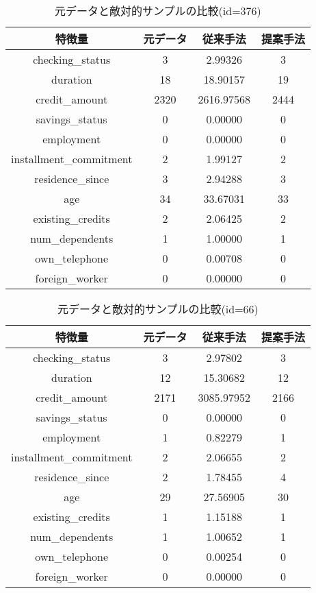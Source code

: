 \begin{table}[H]
    \centering
    \caption{元データと敵対的サンプルの比較(id=376)}
    \begin{tabular}{|c|c|c|c|} \hline
        特徴量 & 元データ & 従来手法 & 提案手法 \\ \hline
        checking\_status & 3 & 2.99326 & 3 \\ \hline
        duration & 18 & 18.90157 & 19 \\ \hline
        credit\_amount & 2320 & 2616.97568 & 2444 \\ \hline
        savings\_status & 0 & 0.00000 & 0 \\ \hline
        employment & 0 & 0.00000 & 0 \\ \hline
        installment\_commitment & 2 & 1.99127 & 2 \\ \hline
        residence\_since & 3 & 2.94288 & 3 \\ \hline
        age & 34 & 33.67031 & 33 \\ \hline
        existing\_credits & 2 & 2.06425 & 2 \\ \hline
        num\_dependents & 1 & 1.00000 & 1 \\ \hline
        own\_telephone & 0 & 0.00708 & 0 \\ \hline
        foreign\_worker & 0 & 0.00000 & 0 \\ \hline
    \end{tabular}
\end{table}

\begin{table}[H]
    \centering
    \caption{元データと敵対的サンプルの比較(id=66)}
    \begin{tabular}{|c|c|c|c|} \hline
        特徴量 & 元データ & 従来手法 & 提案手法 \\ \hline
        checking\_status & 3 & 2.97802 & 3 \\ \hline
        duration & 12 & 15.30682 & 12 \\ \hline
        credit\_amount & 2171 & 3085.97952 & 2166 \\ \hline
        savings\_status & 0 & 0.00000 & 0 \\ \hline
        employment & 1 & 0.82279 & 1 \\ \hline
        installment\_commitment & 2 & 2.06655 & 2 \\ \hline
        residence\_since & 2 & 1.78455 & 4 \\ \hline
        age & 29 & 27.56905 & 30 \\ \hline
        existing\_credits & 1 & 1.15188 & 1 \\ \hline
        num\_dependents & 1 & 1.00652 & 1 \\ \hline
        own\_telephone & 0 & 0.00254 & 0 \\ \hline
        foreign\_worker & 0 & 0.00000 & 0 \\ \hline
    \end{tabular}
\end{table}

